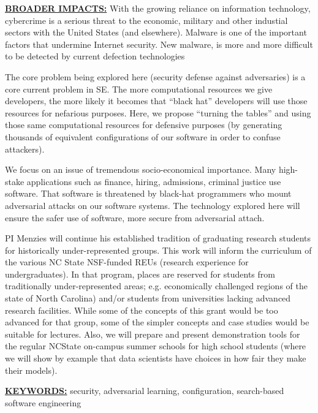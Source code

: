 \documentclass{NSF}
\begin{document}
\begin{nsfsummary}
  
\noindent
\underline{{\bf BROADER IMPACTS:}}
With the growing reliance on  information technology, cybercrime is a serious threat to the economic, military and other industial sectors with the United States
(and elsewhere).   Malware is one of the important factors that undermine Internet security.   New malware,  is more and more difficult to be detected by current defection technologies

The core problem being explored here (security defense against adversaries) is a core current
problem in SE. The more computational resources we give developers, the more likely it becomes that ``black hat'' developers
will use those resources for nefarious purposes. Here, we propose ``turning the  tables'' and using those same computational resources for defensive purposes (by generating thousands of equivalent configurations of our software in order to confuse attackers).

We focus on an issue of tremendous socio-economical importance.
Many high-stake applications such as finance, hiring, admissions, criminal justice use software.
That software is threatened by black-hat programmers who mount adversarial attacks
on our software systems. The technology explored here will ensure the safer use of software,
more secure from adversarial attach.

PI Menzies will continue his established tradition of graduating research students for historically under-represented groups. This work will inform the curriculum of  the various NC State  NSF-funded REUs (research experience for undergraduates).
In that program, places are reserved for students from traditionally under-represented areas; e.g. economically challenged regions of the state of North Carolina) and/or students from universities lacking advanced research facilities. While some of the concepts of this grant would be too advanced for that group, some of the simpler concepts and case studies would be suitable for lectures. Also, we will prepare and present demonstration tools for the regular NCState on-campus summer schools for high school students (where we will show by example that data scientists have choices in how fair they make their models).

\noindent \underline{{\bf KEYWORDS:}} security, adversarial learning, configuration, search-based software engineering 
\end{nsfsummary}
\end{document}

